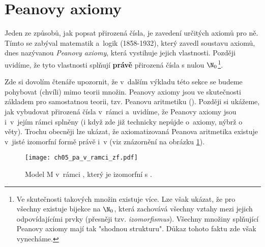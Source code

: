 \section{Peanovy axiomy}\label{sec:peanovy_axiomy}
Jeden ze způsobů, jak popsat přirozená čísla, je zavedení určitých axiomů pro ně. Tímto se zabýval matematik a~logik  \mbox{(1858-1932)}, který zavedl soustavu axiomů, dnes nazývanou \emph{Peanovy axiomy}, která vystihuje jejich vlastnosti. Později uvidíme, že tyto vlastnosti splňují \textbf{právě} přirozená čísla s nulou $\N_0$\footnote{Ve skutečnosti takových množin existuje více. Lze však ukázat, že pro všechny existuje bijekce na $\N_0$, která zachovává všechny vztahy mezi jejich odpovídajícími prvky (přesněji tzv. \emph{izomorfismus}). Všechny množiny splňující Peanovy axiomy mají tak "shodnou strukturu". Důkaz tohoto faktu zde však vynecháme.}.\par
Zde si dovolím čtenáře upozornit, že v~dalším výkladu této sekce se budeme pohybovat (chvíli) mimo teorii množin. Peanovy axiomy jsou ve skutečnosti základem pro samostatnou teorii, tzv. Peanovu aritmetiku (\PA). Později si ukážeme, jak vybudovat přirozená čísla v~rámci \ZF{} a~uvidíme, že Peanovy axiomy jsou i~v~jejím rámci splněny (i když zde již technicky nepůjde o~axiomy, nýbrž o věty). Trochu obecněji lze ukázat, že axiomatizovaná Peanova aritmetika existuje v~jisté izomorfní formě právě i~v \ZF{} (viz znázornění na obrázku \ref{fig:pa_v_ramci_zf}).
\begin{figure}[H]
    \centering
    \texttt{[image: ch05\_pa\_v\_ramci\_zf.pdf]}
    \caption{Model \textsf{M} v~rámci \ZF{}, který je izomorfní s \PA.}
    \label{fig:pa_v_ramci_zf}
\end{figure}
\medskip

